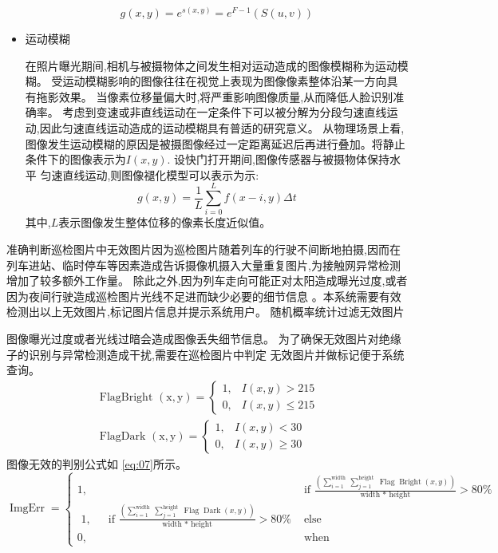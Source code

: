 \documentclass{amsart}
\begin{document}
\begin{itemize}
  \begin{equation}
    \label{eq:04}
g(x, y)=e^{s(x, y)}=e^{F-1}(S(u, v))
  \end{equation}

\item 运动模糊

  在照片曝光期间,相机与被摄物体之间发生相对运动造成的图像模糊称为运动模糊。
  受运动模糊影响的图像往往在视觉上表现为图像像素整体沿某一方向具有拖影效果。
  当像素位移量偏大时,将严重影响图像质量,从而降低人脸识别准确率。
  考虑到变速或非直线运动在一定条件下可以被分解为分段匀速直线运动,因此匀速直线运动造成的运动模糊具有普适的研究意义。
  从物理场景上看,图像发生运动模糊的原因是被摄图像经过一定距离延迟后再进行叠加。将静止条件下的图像表示为$I(x,y)$.
  设快门打开期间,图像传感器与被摄物体保持水平
  匀速直线运动,则图像褪化模型可以表示为示:
  \begin{equation}
    \label{eq:05}
g(x, y)=\frac{1}{L} \sum_{i=0}^{L} f(x-i, y) \Delta t
  \end{equation}
  其中,$L$表示图像发生整体位移的像素长度近似值。
\end{itemize}


\cite{gaohuihuang}
准确判断巡检图片中无效图片因为巡检图片随着列车的行驶不间断地拍摄,因而在列车进站、临时停车等因素造成告诉摄像机摄入大量重复图片,为接触网异常检测增加了较多额外工作量。
除此之外,因为列车走向可能正对太阳造成曝光过度,或者因为夜间行驶造成巡检图片光线不足进而缺少必要的细节信息
。本系统需要有效检测出以上无效图片,标记图片信息并提示系统用户。
随机概率统计过滤无效图片

图像曝光过度或者光线过暗会造成图像丢失细节信息。
为了确保无效图片对绝缘子的识别与异常检测造成干扰,需要在巡检图片中判定
无效图片并做标记便于系统查询。
  \begin{equation}
    \label{eq:06}
\begin{array}{l}
\text { FlagBright }(\mathrm{x}, \mathrm{y})=\left\{\begin{array}{ll}
1, & I(x, y)>215 \\
0, & I(x, y) \leq 215
\end{array}\right. \\
\text { FlagDark }(\mathrm{x}, \mathrm{y})=\left\{\begin{array}{ll}
1, & I(x, y)<30 \\
0, & I(x, y) \geq 30
\end{array}\right.
\end{array}
\end{equation}
图像无效的判别公式如 \ref{eq:07}所示。
\begin{equation}
  \label{eq:07}
\operatorname{ImgErr}=\left\{\begin{array}{cc}
1, & \text { if } \frac{\left(\sum_{i=1}^{\text {width }} \sum_{j=1}^{\text {height }} \operatorname{Flag} \operatorname{Bright}(x, y)\right)}{\text { width * height }}>80 \% \\
\text { 1, } \quad \text { if } \frac{\left(\sum_{i=1}^{\text {width }} \sum_{j=1}^{\text {height }} \operatorname{Flag} \operatorname{Dark}(x, y)\right)}{\text { width * height }}>80 \% & \text { else } \\
0, & \text { when }
\end{array}\right.
\end{equation}
\end{document}
